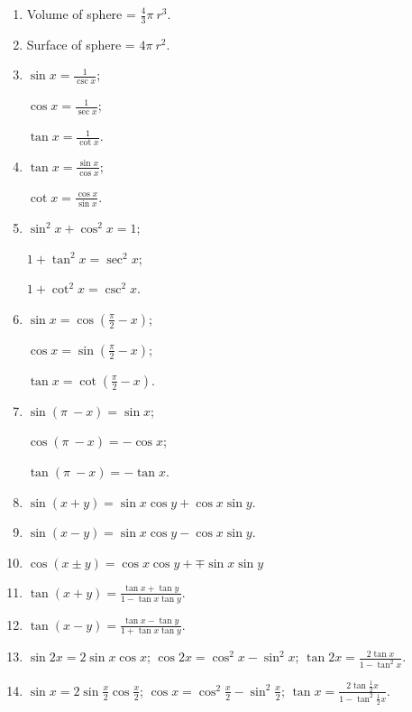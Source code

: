 \begin{enumerate}
\item
Volume of sphere = $\frac{4}{3}\pi\ r^3$.

 \item
Surface of sphere = $4\pi\ r^2$.

\item
$\sin x = \frac{1}{\csc x}$; 

$\cos x = \frac{1}{\sec x}$; 

$\tan x = \frac{1}{\cot x}$.

\item
$\tan x = \frac{\sin{x}}{\cos{x}}$;
 
$\cot{x} = \frac{\cos{x}}{\sin{x}}$.

 \item
$\sin^2 x + \cos^2 x = 1$;

$1 + \tan^2 x = \sec^2 x$;

$1 + \cot^2 x = \csc^2 x$.

\item
$\sin x = \cos \left ( \frac{\pi}{2} - x \right )$; 

$\cos x = \sin \left ( \frac{\pi}{2} - x \right)$; 

$\tan x = \cot \left ( \frac{\pi}{2} - x \right )$.

\item
$\sin(\pi\ - x) = \sin x$; 

$\cos(\pi\ - x) = -\cos x$; 

$\tan(\pi\ - x) = -\tan x$.

 \item
$\sin (x + y) = \sin x \cos y + \cos x \sin y$.

\item
$\sin (x-y) = \sin x \cos y-\cos x \sin y$.

\item
$\cos(x \pm y) = \cos x \cos y +\mp \sin x \sin y$

 \item
$\tan(x + y) = \frac{\tan x + \tan y}{1 - \tan x \tan y}$.

\item
$\tan(x - y) = \frac{\tan x - \tan y}{1 + \tan x \tan y}$.

 \item
$\sin 2x = 2 \sin x \cos x$; 
$\cos 2x = \cos^2 x - \sin^2 x$; 
$\tan 2x = \frac{2 \tan x}{1 - \tan^2 x}$.

\item
$\sin x = 2\sin \frac{x}{2} \cos \frac{x}{2}$; 
$\cos x = \cos^2 \frac{x}{2} - \sin^2 \frac{x}{2}$; 
$\tan x = \frac{2 \tan \frac{1}{2} x}{1 - \tan^2 \frac{1}{2} x}$.


\end{enumerate}
